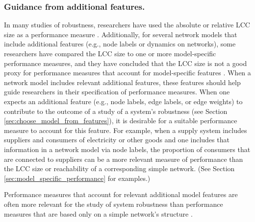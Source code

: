 \documentclass{comnet-mod}
\begin{document}
\subsubsection{Guidance from additional features.} 

In many studies of robustness, researchers have used the absolute or relative LCC size as a performance measure
\cite{Albert2000, Cohen2000, Cohen2000, Holme2002, Dodds2003, Shargel2003, Barrett2004, Bollobas2004, Motter2004, Paul2004, Beygelzimer2005, Tanizawa2005, Estrada2006, Wang2006, Sole2008, Sole2008, Chaverri2010, Cohen2010, Herrmann2011, Nair2011, Schneider2011, Wu2011, Zeng2012, Zeng2012, Zhou2012, Bilal2013, Hossain2013, Iyer2013, Louzada2013, Sha2013, Sha2013, Trajanovski2013, Zhang2013a, Danziger2014, Lordan2014, Priester2014, Ventresca2014, Wang2014, Wang2014a, Wang2014a, Zhou2014, Ahmadi2015, Gao2015, Gong2015, LaRocca2015, Nie2015, Radicchi2015, Wang2015, Yang2015, Agreste2016, Khansari2016, Ren2016, Schieber2016, Williams2016, DeDomenico2017, Mourier2017, Sun2017, daCunha2017, Phan2018, Deng2019, Yamashita2019, Kazawa2020, Mimar2022, Ferrari2023, Tomassini2023, Borge-Holthoefer2012, Rosas-Casals2007}. 
Additionally, for several network models that include additional features (e.g., node labels or dynamics on networks), some researchers have compared the LCC size to one or more model-specific performance measures, and they have concluded that the LCC size is not a good proxy for performance measures that account for model-specific features \cite{Winterbach2011, LaRocca2015}. When a network model includes relevant additional features, these features should help guide researchers in their specification of performance measures. When one expects an additional feature (e.g., node labels, edge labels, or edge weights) to contribute to the outcome of a study of a system's robustness (see Section \ref{sec:choose_model_from_features}), it is desirable for a suitable performance measure to account for this feature. For example, when a supply system includes suppliers and consumers of electricity or other goods and one includes that information in a network model via node labels, the proportion of consumers that are connected to suppliers can be a more relevant measure of performance than the LCC size or reachability of a corresponding simple network. (See Section \ref{sec:model_specific_performance} for examples.) 

Performance measures that account for relevant additional model features are often more relevant for the study of system robustness than performance measures that are based only on a simple network's structure \cite{LaRocca2015, Dong2019}.
\end{document}
